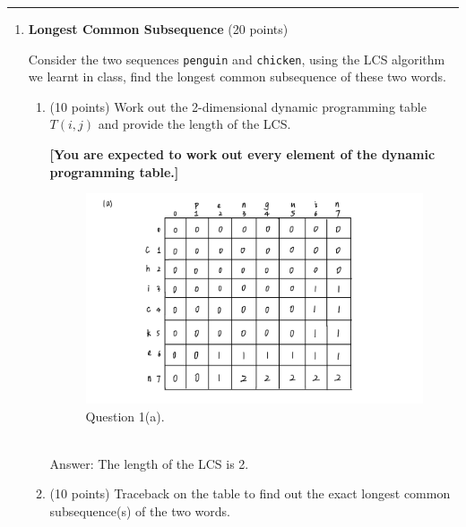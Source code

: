 \documentclass[12pt]{article}
\begin{document}
\rule{\linewidth}{0.4pt}



\begin{enumerate}

\item \textbf{Longest Common Subsequence} (20 points)

Consider the two sequences \texttt{penguin} and \texttt{chicken}, using the LCS algorithm we learnt in class, find the longest common subsequence of these two words.
\begin{enumerate}
\item (10 points) Work out the 2-dimensional dynamic programming table $T(i,j)$ and provide the length of the LCS. 

\textbf{[You are expected to work out every element of the dynamic programming table.]}
{ \begin{figure}[h]
  	\centering
  	\includegraphics*[scale=0.2]{HW4-1.jpg}
	\caption{Question 1(a).}
	\label{fig:example}
  \end{figure}}
  \\{\color{blue}Answer: The length of the LCS is 2.
  }

\item (10 points) Traceback on the table to find out the exact longest common subsequence(s) of the two words.


\end{enumerate}
\end{enumerate}
\end{document}
